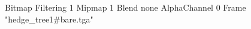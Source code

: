 {Bitmap
	{Filtering 1}
	{Mipmap 1}
	{Blend none}
	{AlphaChannel 0}
	{Frame "hedge_tree1#bare.tga"}
}
